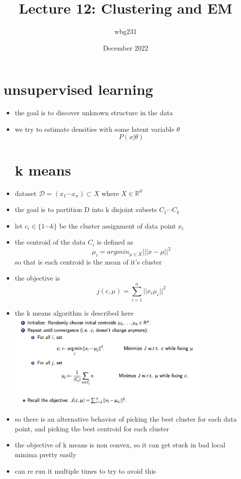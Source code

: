 \documentclass{article}
\title{Lecture 12: Clustering and EM}
\author{wbg231 }
\date{December 2022}
\begin{document}
\maketitle

\section{unsupervised learning}
\begin{itemize}
\item the goal is to discover unknown structure in the data 
\item we try to estimate densities with some latent variable $\theta$  $$P(x|\theta)$$
\section*{k means }
\item dataset $\mathcal{D}=(x_1\cdots x_n)\subset X$ where $X\in \mathbb{R}^{d}$
\item the goal is to partition D into k disjoint subsets $C_1\cdots C_k$
\item let $c_i\in\{1\cdots k\}$ be the cluster assignment of data point $x_i$
\item  the centroid of the data $C_i$ is defined as $$\mu_i=argmin_{\mu\in X}|||x-\mu||^{2}$$ so that is each centroid is the  mean of it's cluster 
\item the objective is $$j(c,\mu)=\sum_{i=1}^{n}||x_i\mu_c||^{2}$$
\item the k means algorithm is described here \\ \includegraphics*[width=10cm]{images/Screenshot 2023-05-15 at 2.24.47 AM.png}
\item so there is an alternative behavior of picking the best cluster for each data point, and picking the best centroid for each cluster
\item the objective of k means is non convex, so it can get stuck in bad local minima pretty easily
\item can re run it multiple times to try to avoid this 

\end{itemize}
\end{document}
